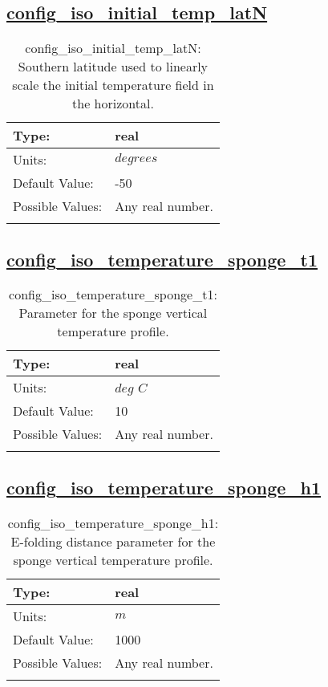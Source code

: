 \subsection[config\_iso\_initial\_temp\_latN]{\hyperref[sec:nm_tab_iso]{config\_iso\_initial\_temp\_latN}}
\label{subsec:nm_sec_config_iso_initial_temp_latN}
\begin{center}
\begin{longtable}{| p{2.0in} || p{4.0in} |}
    \hline
    Type: & real \\
    \hline
    Units: & $degrees$ \\
    \hline
    Default Value: & -50 \\
    \hline
    Possible Values: & Any real number. \\
    \hline
    \caption{config\_iso\_initial\_temp\_latN: Southern latitude used to linearly scale the initial temperature field in the horizontal.}
\end{longtable}
\end{center}
\subsection[config\_iso\_temperature\_sponge\_t1]{\hyperref[sec:nm_tab_iso]{config\_iso\_temperature\_sponge\_t1}}
\label{subsec:nm_sec_config_iso_temperature_sponge_t1}
\begin{center}
\begin{longtable}{| p{2.0in} || p{4.0in} |}
    \hline
    Type: & real \\
    \hline
    Units: & $deg$ $C$ \\
    \hline
    Default Value: & 10 \\
    \hline
    Possible Values: & Any real number. \\
    \hline
    \caption{config\_iso\_temperature\_sponge\_t1: Parameter for the sponge vertical temperature profile.}
\end{longtable}
\end{center}
\subsection[config\_iso\_temperature\_sponge\_h1]{\hyperref[sec:nm_tab_iso]{config\_iso\_temperature\_sponge\_h1}}
\label{subsec:nm_sec_config_iso_temperature_sponge_h1}
\begin{center}
\begin{longtable}{| p{2.0in} || p{4.0in} |}
    \hline
    Type: & real \\
    \hline
    Units: & $m$ \\
    \hline
    Default Value: & 1000 \\
    \hline
    Possible Values: & Any real number. \\
    \hline
    \caption{config\_iso\_temperature\_sponge\_h1: E-folding distance parameter for the sponge vertical temperature profile.}
\end{longtable}
\end{center}
